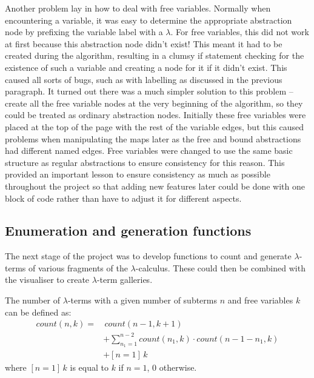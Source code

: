 \documentclass[11pt]{article}
\begin{document}
Another problem lay in how to deal with free variables. Normally when encountering a variable, it was easy to determine the appropriate abstraction node by prefixing the variable label with a $\lambda$. For free variables, this did not work at first because this abstraction node didn't exist! This meant it had to be created during the algorithm, resulting in a clumsy if statement checking for the existence of such a variable and creating a node for it if it didn't exist. This caused all sorts of bugs, such as with labelling as discussed in the previous paragraph. It turned out there was a much simpler solution to this problem -- create all the free variable nodes at the very beginning of the algorithm, so they could be treated as ordinary abstraction nodes. Initially these free variables were placed at the top of the page with the rest of the variable edges, but this caused problems when manipulating the maps later as the free and bound abstractions had different named edges. Free variables were changed to use the same basic structure as regular abstractions to ensure consistency for this reason. This provided an important lesson to ensure consistency as much as possible throughout the project so that adding new features later could be done with one block of code rather than have to adjust it for different aspects.


\subsection{Enumeration and generation functions}
The next stage of the project was to develop functions to count and generate $\lambda$-terms of various fragments of the $\lambda$-calculus. These could then be combined with the visualiser to create $\lambda$-term galleries.

The number of $\lambda$-terms with a given number of subterms $n$ and free variables $k$ can be defined as:
%
\begin{equation*}
\begin{split}
    count(n, k) = & \, count(n-1,k+1) \\
                & + \sum_{n_1 = 1}^{n - 2} count(n_1, k) \cdot count(n - 1 - n_1, k) \\
                & + [n = 1] \, k
\end{split}
\end{equation*}
%
where $[n = 1] \, k$ is equal to $k$ if $n = 1$, $0$ otherwise. 
\end{document}
